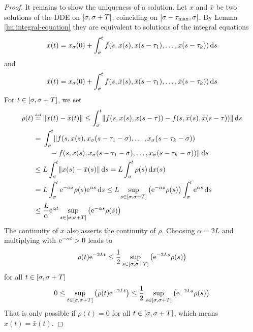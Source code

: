 \begin{proof}
        It remains to show the uniqueness of a solution.
        Let $x$ and $\bar{x}$ be two solutions of the DDE on $\compactum{\tzero}{\tzero+T}$, coinciding on $\compactum{\tzero-\taumax}{\tzero}$.
        By Lemma \ref{lm:integral-equation} they are equivalent to solutions of the integral equations
        \begin{equation*}
            x(t) = x_\tzero(0) + \integral{\tzero}{t} f(s,x(s),x(s-\tau_1),\ldots,x(s-\tau_k))\dx[s]
        \end{equation*}
        and
        \begin{equation*}
            \bar{x}(t) = x_\tzero(0) + \integral{\tzero}{t} f(s,\bar{x}(s),\bar{x}(s-\tau_1),\ldots,\bar{x}(s-\tau_k))\dx[s]
        \end{equation*}
        For $t\in\compactum{\tzero}{\tzero+T}$, we set
        \begin{align*}
            \rho(t) &\defeq \nnorm*{x(t)-\bar{x}(t)}
            \leq \integral{\tzero}{t} \nnorm*{f(s,x(s),x(s-\tau))-f(s,\bar{x}(s),\bar{x}(s-\tau))}\dx[s]\\
            &= \!\begin{multlined}[t][0.8\displaywidth]
                \integral{\tzero}{t} \lVert f(s,x(s),x_{\tzero}(s-\tau_1-\tzero),\ldots,x_{\tzero}(s-\tau_k-\tzero))\\
                -f(s,\bar{x}(s),x_{\tzero}(s-\tau_1-\tzero),\ldots,x_{\tzero}(s-\tau_k-\tzero))\rVert\dx[s]
            \end{multlined}\\
            & \leq L \integral{\tzero}{t} \nnorm*{x(s)-\bar{x}(s)}\dx[s] = L \integral{\tzero}{t} \rho(s)\dx(s)\\
            &= L \integral{\tzero}{t} \e{-\alpha s}\rho(s)\e{\alpha s}\dx[s] \leq L \sup_{s\in [\tzero,\tzero+T]}\left(\e{-\alpha s}\rho(s)\right)\integral{\tzero}{t} \e{\alpha s}\dx[s]\\
            & \leq\frac{L}{\alpha}\e{\alpha t} \sup_{s\in [\tzero,\tzero+T]}\left(\e{-\alpha s}\rho(s)\right)
        \end{align*}
        The continuity of $x$ also asserts the continuity of $\rho$.
        Choosing $\alpha=2L$ and multiplying with $\e{-\alpha t}>0$ leads to
        \begin{equation*}
            \rho(t)\e{-2Lt} \leq \frac{1}{2}\sup_{s\in [\tzero,\tzero+T]}\left(\e{-2L s}\rho(s)\right)
        \end{equation*}
        for all $t\in [\tzero,\tzero+T]$
        \begin{equation*}
            0 \leq \sup_{t\in [\tzero,\tzero+T]}\left(\rho(t)\e{-2Lt}\right) \leq \frac{1}{2}\sup_{s\in [\tzero,\tzero+T]}\left(\e{-2L s}\rho(s)\right)
        \end{equation*}
        That is only possible if $\rho(t)=0$ for all $t\in [\tzero,\tzero+T]$, which means $x(t)=\bar{x}(t)$.
    \end{proof}

